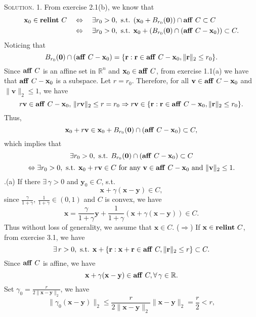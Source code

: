 \documentclass[12pt, a4paper, oneside]{ctexart}
\newenvironment{solution}{\par\noindent\textsc{Solution. }}{\\\par}
\DeclareMathOperator*{\relint}{\bf relint\,}
\DeclareMathOperator*{\aff}{\bf aff\,}
\begin{document}
\begin{solution}
	1. From exercise 2.1(b), we know that 
	\begin{align*}
		\mathbf{x}_0 \in \relint C 
		& \quad \Leftrightarrow \quad \exists r_0 > 0, \text{ s.t. } (\mathbf{x}_0 + B_{r_0}(\mathbf{0})) \cap \aff C \subset C \\
		& \quad \Leftrightarrow \quad \exists r_0 > 0, \text{ s.t. } \mathbf{x}_0 + (B_{r_0}(\mathbf{0}) \cap (\aff C - \mathbf{x}_0)) \subset C.
	\end{align*}
	Noticing that 
	\[
	B_{r_0}(\mathbf{0}) \cap (\aff C - \mathbf{x}_0) = \{\mathbf{r} : \mathbf{r} \in \aff C - \mathbf{x}_0, \|\mathbf{r}\|_2 \leq r_0\}.
	\]
	Since $\aff C$ is an affine set in $\mathbb{R}^n$ and $\mathbf{x}_0 \in \aff C$, from exercise 1.1(a) we have that $\aff C - \mathbf{x}_0$ is a subspace. Let $r = r_0$. Therefore, for all $\mathbf{v} \in \aff C - \mathbf{x}_0$ and $\|\mathbf{v}\|_2 \leq 1$, we have 
	\[
	r \mathbf{v} \in \aff C - \mathbf{x}_0,\, \|r \mathbf{v}\|_2 \leq r = r_0 \Rightarrow r\mathbf{v} \in \{\mathbf{r} : \mathbf{r} \in \aff C - \mathbf{x}_0, \|\mathbf{r}\|_2 \leq r_0\}.
	\]
	Thus, 
	\[
	\mathbf{x}_0 + r \mathbf{v} \in \mathbf{x}_0 + B_{r_0}(\mathbf{0}) \cap (\aff C - \mathbf{x}_0) \subset C,
	\]
	which implies that 
	\[
	\exists r_0 > 0, \text{ s.t. } B_{r_0}(\mathbf{0}) \cap (\aff C - \mathbf{x}_0) \subset C 
	\]
	\[
	\Leftrightarrow \exists r_0 > 0, \text{ s.t. } \mathbf{x}_0 + r \mathbf{v} \in C \text{ for any } \mathbf{v} \in \aff C - \mathbf{x}_0 \text{ and } \|\mathbf{v}\|_2 \leq 1.
	\]
	.(a) If there $\exists\, \gamma > 0$ and $\mathbf{y}_0 \in C$, s.t.
	\[
	\mathbf{x} + \gamma (\mathbf{x} - \mathbf{y}) \in C,
	\]
	since $\frac{\gamma}{1 + \gamma}$, $\frac{1}{1 + \gamma} \in (0, 1)$ and $C$ is convex, we have 
	\[
	\mathbf{x} = \frac{\gamma}{1 + \gamma}\mathbf{y} + \frac{1}{1 + \gamma}(\mathbf{x} + \gamma (\mathbf{x} - \mathbf{y})) \in C.
	\]
	Thus without loss of generality, we assume that $\mathbf{x} \in C$.
	\newline
	($\Rightarrow$) If $\mathbf{x} \in \relint C$, from exercise 3.1, we have
	\[
	\exists\, r > 0, \text{ s.t. } \mathbf{x} + \{\mathbf{r} : \mathbf{x} + \mathbf{r} \in \aff C, \|\mathbf{r}\|_2 \leq r\} \subset C.
	\]
	Since $\aff C$ is affine, we have
	\[
	\mathbf{x} + \gamma (\mathbf{x} - \mathbf{y}) \in \aff C, \forall\, \gamma \in \mathbb{R}.
	\]
	Set $\gamma_0 = \frac{r}{2\|\mathbf{x} - \mathbf{y}\|_2}$, we have
	\[
	\|\gamma_0 (\mathbf{x} - \mathbf{y})\|_2 \leq \frac{r}{2\|\mathbf{x} - \mathbf{y}\|_2} \|\mathbf{x} - \mathbf{y}\|_2 = \frac{r}{2} < r,
\]
\end{solution}
\end{document}
